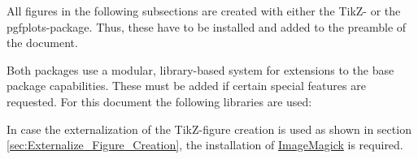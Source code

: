 
All figures in the following subsections are created with either the TikZ- or the pgfplots-package. Thus, these have to be installed and added to the preamble of the document.

\begin{texcode}
\usepackage{pgfplots}
\usepackage{tikz}
\end{texcode}

Both packages use a modular, library-based system for extensions to the base package capabilities. These must be added if certain special features are requested. For this document the following libraries are used:

\begin{texcode}
\usetikzlibrary{arrows.meta}
\usetikzlibrary{calc}
\usetikzlibrary{decorations.markings}
\usetikzlibrary{intersections}
\usetikzlibrary{trees}
\usetikzlibrary{positioning}
\usetikzlibrary{spy}
\end{texcode}

In case the externalization of the TikZ-figure creation is used as shown in section \ref{sec:Externalize_Figure_Creation}, the installation of \href{http://www.imagemagick.org/script/index.php}{ImageMagick} is required.
